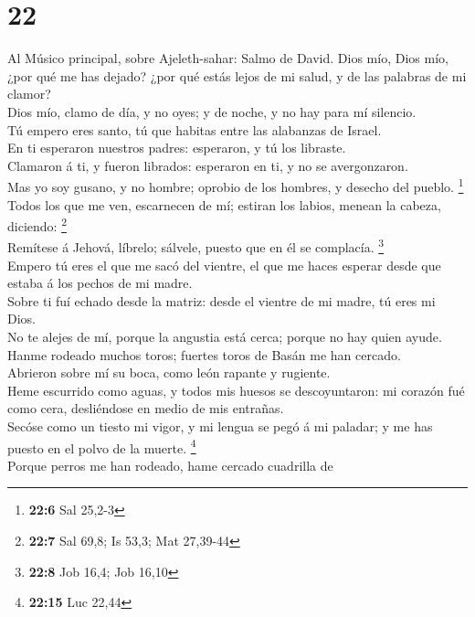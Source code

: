 \hypertarget{section-21}{%
\section{22}\label{section-21}}

 Al Músico principal, sobre Ajeleth-sahar: Salmo de David.
Dios mío, Dios mío, ¿por qué me has dejado? ¿por qué estás lejos de mi
salud, y de las palabras de mi clamor?\\
 Dios mío, clamo de día, y no oyes; y de noche, y no hay
para mí silencio.\\
 Tú empero eres santo, tú que habitas entre las alabanzas de
Israel.\\
 En ti esperaron nuestros padres: esperaron, y tú los
libraste.\\
 Clamaron á ti, y fueron librados: esperaron en ti, y no se
avergonzaron.\\
 Mas yo soy gusano, y no hombre; oprobio de los hombres, y
desecho del pueblo. \footnote{\textbf{22:6} Sal 25,2-3}\\
 Todos los que me ven, escarnecen de mí; estiran los labios,
menean la cabeza, diciendo: \footnote{\textbf{22:7} Sal 69,8; Is 53,3;
  Mat 27,39-44}\\
 Remítese á Jehová, líbrelo; sálvele, puesto que en él se
complacía. \footnote{\textbf{22:8} Job 16,4; Job 16,10}\\
 Empero tú eres el que me sacó del vientre, el que me haces
esperar desde que estaba á los pechos de mi madre.\\
 Sobre ti fuí echado desde la matriz: desde el vientre de
mi madre, tú eres mi Dios.\\
 No te alejes de mí, porque la angustia está cerca; porque
no hay quien ayude.\\
 Hanme rodeado muchos toros; fuertes toros de Basán me han
cercado.\\
 Abrieron sobre mí su boca, como león rapante y rugiente.\\
 Heme escurrido como aguas, y todos mis huesos se
descoyuntaron: mi corazón fué como cera, desliéndose en medio de mis
entrañas.\\
 Secóse como un tiesto mi vigor, y mi lengua se pegó á mi
paladar; y me has puesto en el polvo de la muerte. \footnote{\textbf{22:15}
  Luc 22,44}\\
 Porque perros me han rodeado, hame cercado cuadrilla de

